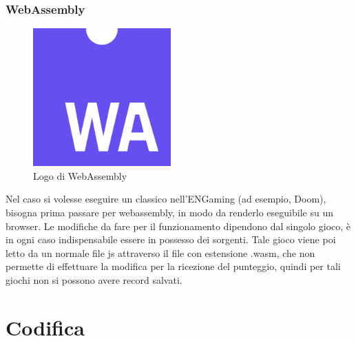 \subsubsection{WebAssembly}
\begin{figure}[h]
    \centering
    \includegraphics[width=150pt]{images/technologies/webassembly.png}
    \caption{Logo di WebAssembly}
    \label{fig:webassembly}
\end{figure}
Nel caso si volesse eseguire un classico nell'ENGaming (ad esempio, Doom), bisogna prima passare per \gls{webassembly}, in modo da renderlo eseguibile su un browser.
Le modifiche da fare per il funzionamento dipendono dal singolo gioco, è in ogni caso indispensabile essere in possesso dei sorgenti.
Tale gioco viene poi letto da un normale file \gls{js} attraverso il file con estensione .wasm, che non permette di effettuare la modifica per la ricezione del punteggio, quindi per tali giochi non si possono avere record salvati.


\section{Codifica}
